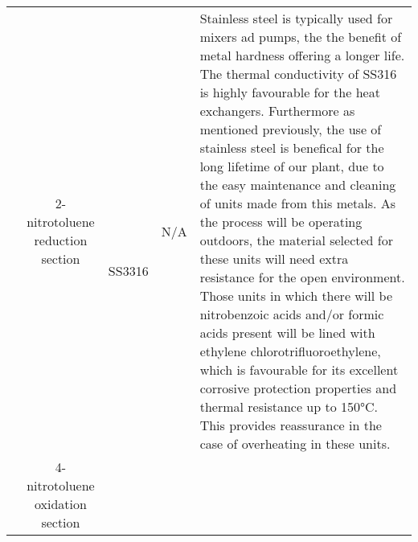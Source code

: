 \begin{table}[H]
\begin{tabular}{@{}lcccl@{}}
         & 2-nitrotoluene reduction section                         &   \multirow{4}{*}{SS3316}  & N/A       &   \multirow{-4}{*}{Stainless   steel is typically used for mixers ad pumps, the the benefit of metal   hardness offering a longer life. The thermal conductivity of SS316 is highly   favourable for the heat exchangers. Furthermore as mentioned previously, the   use of stainless steel is benefical for the long lifetime of our plant, due   to the easy maintenance and cleaning of units made from this metals. As the   process will be operating outdoors, the material selected for these units   will need extra resistance for the open environment.  Those units in which there will be nitrobenzoic acids and/or formic acids   present will be lined with ethylene chlorotrifluoroethylene, which is   favourable for its excellent corrosive protection properties and thermal   resistance up to 150°C. This provides reassurance in the case of overheating   in these units.}                                                                                                                                                                                                                                                                                                                                                                                                                                                                                                                                                                                                                                                                                                                                                                                                                                                                                                                                                   \\
                                                      & 4-nitrotoluene oxidation section                         &                                                                                               &                                                    &                                                                                                                                                                                                                                                                                                                                                                                                                                                                                                                                                                                                                                                                                                                                                                                                                                                                                                                                                     \\

\end{tabular}
\end{table}
